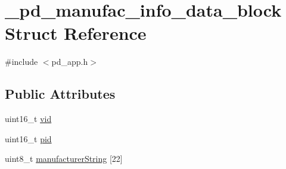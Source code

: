 \hypertarget{struct__pd__manufac__info__data__block}{\section{\-\_\-pd\-\_\-manufac\-\_\-info\-\_\-data\-\_\-block Struct Reference}
\label{struct__pd__manufac__info__data__block}
}


{\ttfamily \#include $<$pd\-\_\-app.\-h$>$}

\subsection*{Public Attributes}
\begin{DoxyCompactItemize}
\item 
uint16\-\_\-t \hyperlink{struct__pd__manufac__info__data__block_a36cef0d659afc8d14083aeb98cdf3741}{vid}
\item 
uint16\-\_\-t \hyperlink{struct__pd__manufac__info__data__block_abe4afcb81048be6703607c1c2a21e25e}{pid}
\item 
uint8\-\_\-t \hyperlink{struct__pd__manufac__info__data__block_a02e7724a7ade9d8136676933ec43b637}{manufacturer\-String} \mbox{[}22\mbox{]}
\end{DoxyCompactItemize}


